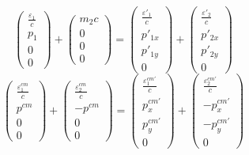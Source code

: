 \documentclass[a4paper,11pt,dvipdfmx]{jsarticle}
\begin{document}
\begin{equation}
    \left(
    \begin{array}{c}
     \frac{\varepsilon_{1}}{c}  \\
      p_{1}\\
      0 \\
      0
    \end{array}
  \right)  + \left(
    \begin{array}{c}
      m_{2}c \\
      0\\
      0 \\
      0
    \end{array}
  \right)=
      \left(
    \begin{array}{c}
     \frac{\varepsilon'_{1}}{c}  \\
      p'_{1x}\\
      p'_{1y}\\
      0
    \end{array}
  \right) +
    \left(
    \begin{array}{c}
     \frac{\varepsilon'_{2}}{c}  \\
      p'_{2x}\\
      p'_{2y}\\
      0
    \end{array}
  \right) \label{eq:yogen1}
\end{equation}
\begin{equation}
    \left(
    \begin{array}{c}
     \frac{\varepsilon_{1}^{cm}}{c}  \\
      p^{cm}\\
      0 \\
      0
    \end{array}
  \right)  + \left(
    \begin{array}{c}
      \frac{\varepsilon_{2}^{cm}}{c}  \\
      -p^{cm}\\
      0 \\
      0
    \end{array}
  \right)=
      \left(
    \begin{array}{c}
     \frac{\varepsilon^{cm'}_{1}}{c}  \\
      p^{cm'}_{x}\\
      p^{cm'}_{y}\\
      0
    \end{array}
  \right) +
    \left(
    \begin{array}{c}
     \frac{\varepsilon^{cm'}_{2}}{c}  \\
      -p^{cm'}_{x}\\
      -p^{cm'}_{y}\\
      0
    \end{array}
  \right) \label{eq:yogen2}
\end{equation}
\end{document}
